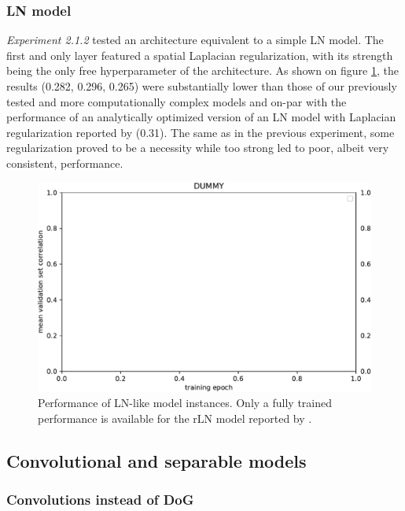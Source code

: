 \subsubsection{LN model}

\textit{Experiment 2.1.2} tested an architecture equivalent to a simple LN model. The first and only layer featured a spatial Laplacian regularization, with its strength being the only free hyperparameter of the architecture. As shown on figure \ref{fig:5.2.1.2}, the results (0.282, 0.296, 0.265) were substantially lower than those of our previously tested and more computationally complex models and on-par with the performance of an analytically optimized version of an LN model with Laplacian regularization reported by \cite{antolik} (0.31). The same as in the previous experiment, some regularization proved to be a necessity while too strong led to poor, albeit very consistent, performance.

\begin{figure}[H]
    \centering
    \includegraphics[width=1\textwidth]{../figures/05_dummy}
    \caption[Experiment 5.2.1.2]{Performance of LN-like model instances. Only a fully trained performance is available for the rLN model reported by \citeauthor{antolik}\protect\footnotemark.}
    \label{fig:5.2.1.2}
\end{figure}

\subsection{Convolutional and separable models}
\subsubsection{Convolutions instead of DoG}

